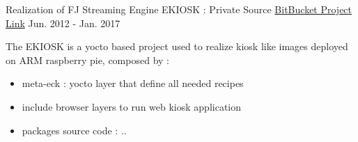 \documentclass[11pt, a4paper]{awesome-cv} %
\begin{document}
\begin{cventries}
    \cventry
    {Realization of FJ Streaming Engine} %
    {EKIOSK : Private Source} %
    { \href{https://bitbucket.org/easysoftin/workspace/projects/ECK}{BitBucket Project Link} }%
    {Jun. 2012 - Jan. 2017}  %
    { %
        \begin{cvitems}
            \item {The EKIOSK is a yocto based project used to realize kiosk like images deployed on ARM raspberry pie, composed by :}
            \begin{itemize}
                \item { meta-eck : yocto layer that define all needed recipes }
                \item { include browser layers to run web kiosk application }            
                \item { packages source code : ..}            
            \end{itemize}
        \end{cvitems}
    }



\end{cventries}
\end{document}
